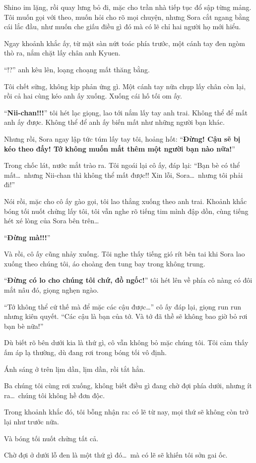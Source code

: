 \documentclass[../main.tex]{subfiles}
\begin{document}
Shino im lặng, rồi quay lưng bỏ đi, mặc cho trần nhà tiếp tục đổ sập từng mảng. Tôi muốn gọi với theo, muốn hỏi cho rõ mọi chuyện, nhưng Sora cắt ngang bằng cái lắc đầu, như muốn che giấu điều gì đó mà có lẽ chỉ hai người họ mới hiểu.

Ngay khoảnh khắc ấy, từ mặt sàn nứt toác phía trước, một cánh tay đen ngòm thò ra, nắm chặt lấy chân anh Kyuen.


``!?'' anh kêu lên, loạng choạng mất thăng bằng.

Tôi chết sững, không kịp phản ứng gì. Một cánh tay nữa chụp lấy chân còn lại, rồi cả hai cùng kéo anh ấy xuống. Xuống cái hố tối om ấy.

``\textbf{Nii-chan!!!}'' tôi hét lạc giọng, lao tới nắm lấy tay anh trai. Không thể để mất anh ấy được. Không thể để anh ấy biến mất như những người bạn khác.

Nhưng rồi, Sora ngay lập tức túm lấy tay tôi, hoảng hốt: ``\textbf{Đừng! Cậu sẽ bị kéo theo đấy! Tớ không muốn mất thêm một người bạn nào nữa!}''

Trong chốc lát, nước mắt trào ra. Tôi ngoái lại cô ấy, đáp lại: ``Bạn bè có thể mất\dots\ nhưng Nii-chan thì không thể mất được!! Xin lỗi, Sora\dots\ nhưng tôi phải đi!''

Nói rồi, mặc cho cô ấy gào gọi, tôi lao thẳng xuống theo anh trai. Khoảnh khắc bóng tối nuốt chửng lấy tôi, tôi vẫn nghe rõ tiếng tim mình đập dồn, cùng tiếng hét xé lòng của Sora bên trên\dots

``\textbf{Đừng mà!!!}''

Và rồi, cô ấy cũng nhảy xuống. Tôi nghe thấy tiếng gió rít bên tai khi Sora lao xuống theo chúng tôi, áo choàng đen tung bay trong không trung.

``\textbf{Đừng có lo cho chúng tôi chứ, đồ ngốc!}'' tôi hét lên về phía cô nàng có đôi mắt nâu đó, giọng nghẹn ngào.

``Tớ không thể cứ thế mà để mặc các cậu được\dots'' cô ấy đáp lại, giọng run run nhưng kiên quyết. ``Các cậu là bạn của tớ. Và tớ đã thề sẽ không bao giờ bỏ rơi bạn bè nữa!''

Dù biết rõ bên dưới kia là thứ gì, cô vẫn không bỏ mặc chúng tôi. Tôi cảm thấy ấm áp lạ thường, dù đang rơi trong bóng tối vô định.

Ánh sáng ở trên lịm dần, lịm dần, rồi tắt hẳn.

Ba chúng tôi cùng rơi xuống, không biết điều gì đang chờ đợi phía dưới, nhưng ít ra\dots\ chúng tôi không hề đơn độc.

Trong khoảnh khắc đó, tôi bỗng nhận ra: có lẽ từ nay, mọi thứ sẽ không còn trở lại như trước nữa.

Và bóng tối nuốt chửng tất cả.

Chờ đợi ở dưới lỗ đen là một thứ gì đó\dots\ mà có lẽ sẽ khiến tôi sởn gai ốc.
\end{document}
